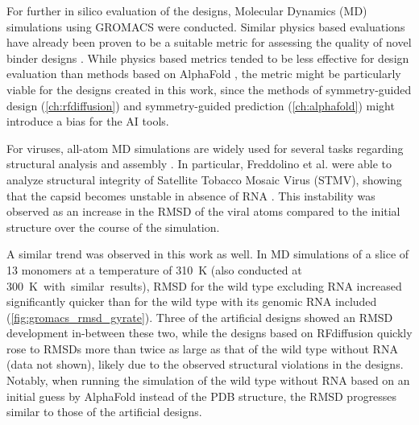 For further in silico evaluation of the designs, Molecular Dynamics (MD) simulations using GROMACS \cite{gromacs_general} were conducted. Similar physics based evaluations have already been proven to be a suitable metric for assessing the quality of novel binder designs \cite{physics_binder_design}. While physics based metrics tended to be less effective for design evaluation than methods based on AlphaFold \cite{binder_design}, the metric might be particularly viable for the designs created in this work, since the methods of symmetry-guided design (\autoref{ch:rfdiffusion}) and symmetry-guided prediction (\autoref{ch:alphafold}) might introduce a bias for the AI tools. 

For viruses, all-atom MD simulations are widely used for several tasks regarding structural analysis and assembly \cite{md_viral_analysis_review}. In particular, Freddolino et al. were able to analyze structural integrity of Satellite Tobacco Mosaic Virus  (STMV), showing that the capsid becomes unstable in absence of RNA \cite{md_tmv_stability}. This instability was observed as an increase in the RMSD of the viral atoms compared to the initial structure over the course of the simulation. 

A similar trend was observed in this work as well. In MD simulations of a slice of 13 monomers at a temperature of \SI{310}{\kelvin} (also conducted at \SI{300}{\kelvin with similar results}), RMSD for the wild type excluding RNA increased significantly quicker than for the wild type with its genomic RNA included (\autoref{fig:gromacs_rmsd_gyrate}). Three of the artificial designs showed an RMSD development in-between these two, while the designs based on RFdiffusion quickly rose to RMSDs more than twice as large as that of the wild type without RNA (data not shown), likely due to the observed structural violations in the designs. Notably, when running the simulation of the wild type without RNA based on an initial guess by AlphaFold instead of the PDB structure, the RMSD progresses similar to those of the artificial designs.

